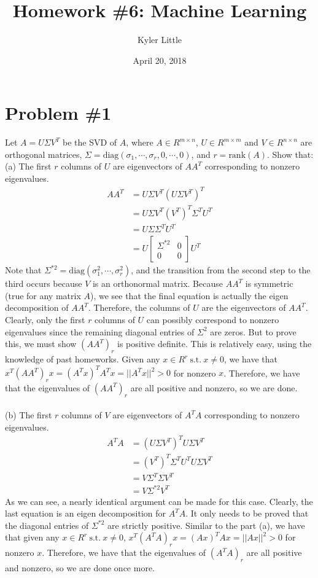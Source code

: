 \documentclass[12pt]{article}
\author{Kyler Little\vspace{-0.6cm}}
\title{Homework \#6: Machine Learning\vspace{-0.3cm}}
\date{April 20, 2018\vspace{-0.7cm}}
\begin{document}
	\maketitle
	\section*{Problem \#1}
	Let $A = U \Sigma V^T$ be the SVD of $A$, where $A \in R^{m\times n}$, $U \in R^{m\times m}$ and $V \in R^{n\times n}$
	are orthogonal matrices, $\Sigma = \text{diag}(\sigma_1 , \cdots, \sigma_r, 0, \cdots, 0)$, and $r = \text{rank}(A)$. Show that: \\
	(a) The first $r$ columns of $U$ are eigenvectors of $AA^T$ corresponding to nonzero eigenvalues. \\
	\begin{align*}
		AA^T &= U\Sigma V^T (U\Sigma V^T)^T \\
		&= U\Sigma V^T (V^T)^T\Sigma^T U^T \\
		&= U\Sigma \Sigma^T U^T \\
		&= U \left[\begin{array}{cc}
		\Sigma^{*2} & 0 \\
		0 & 0
		\end{array}\right] U^T
	\end{align*}
	Note that $\Sigma^{*2} = \text{diag}(\sigma_1^2 , \cdots, \sigma_r^2)$, and the transition from the second step to the third occurs because $V$ is an orthonormal matrix. Because $AA^T$ is symmetric (true for any matrix $A$), we see that the final equation is actually the eigen decomposition of $AA^T$. Therefore, the columns of $U$ are the eigenvectors of $AA^T$. Clearly, only the first $r$ columns of $U$ can possibly correspond to nonzero eigenvalues since the remaining diagonal entries of $\Sigma^2$ are zeros. But to prove this, we must show $(AA^T)_r$ is positive definite. This is relatively easy, using the knowledge of past homeworks. Given any $x \in R^r \ \text{s.t.}\  x \ne 0$, we have that $x^T(AA^T)_r x=(A^T x)^T A^T x = ||A^T x||^2 > 0$ for nonzero $x$. Therefore, we have that the eigenvalues of $(AA^T)_r$ are all positive and nonzero, so we are done.
	\\ \\
	(b) The first $r$ columns of $V$ are eigenvectors of $A^TA$ corresponding to nonzero eigenvalues. \\
	\begin{align*}
	A^T A &= (U\Sigma V^T)^T U\Sigma V^T \\
	&= (V^T)^T\Sigma^T U^T U\Sigma V^T \\
	&= V\Sigma^T \Sigma V^T \\
	&= V \Sigma^{*2} V^T
	\end{align*}
	As we can see, a nearly identical argument can be made for this case. Clearly, the last equation is an eigen decomposition for $A^TA$. It only needs to be proved that the diagonal entries of $\Sigma^{*2}$ are strictly positive. Similar to the part (a), we have that given any $x \in R^r \ \text{s.t.}\  x \ne 0$, $x^T(A^TA)_r x=(Ax)^T Ax = ||Ax||^2 > 0$ for nonzero $x$. Therefore, we have that the eigenvalues of $(A^TA)_r$ are all positive and nonzero, so we are done once more.
	
\end{document}
